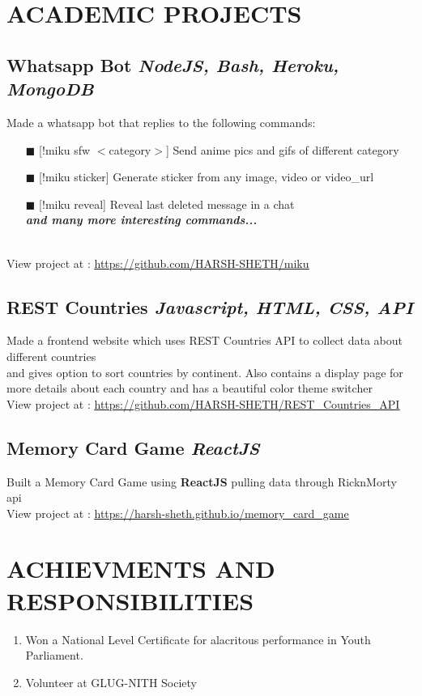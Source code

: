 \documentclass[12pt]{article}
\begin{document}
\section{ACADEMIC PROJECTS}
\subsection*{Whatsapp Bot \hfill \normalsize \textit{NodeJS, Bash, Heroku, MongoDB}}
  \parbox{\textwidth}{ Made a whatsapp bot that replies to the following commands:   
  \begin{itemize}
    \item[$\blacksquare$]{[!miku sfw $<$category$>$] Send anime pics and gifs of different category}
    \item[$\blacksquare$]{[!miku sticker] Generate sticker from any image, video or video\_url }
    \item[$\blacksquare$]{[!miku reveal] Reveal last deleted message in a chat}
      \\ \emph{\textbf{and many more interesting commands...}}
  \end{itemize}
  \\ View project at : \underline{\url{https://github.com/HARSH-SHETH/miku}}
  }
\subsection*{REST Countries \hfill \normalsize \textit{Javascript, HTML, CSS, API}}
  \parbox{\textwidth}{ Made a frontend website which uses REST Countries API to collect data about different countries\\
   and gives option to sort countries by continent. Also contains a display page for more details about each country and has a beautiful color theme switcher\\
   View project at : \underline{\url{https://github.com/HARSH-SHETH/REST_Countries_API}}
  }

\subsection*{Memory Card Game \hfill \normalsize \textit{ReactJS}}
\parbox{\textwidth}{ Built a Memory Card Game using \textbf{ReactJS} pulling data through RicknMorty api
\\ View project at : \underline{\url{https://harsh-sheth.github.io/memory_card_game}}
}
\section{ACHIEVMENTS AND RESPONSIBILITIES}
\begin{enumerate}
  \item Won a National Level Certificate for alacritous performance in Youth Parliament.
  \item Volunteer at GLUG-NITH Society
\end{enumerate}

\end{document}
